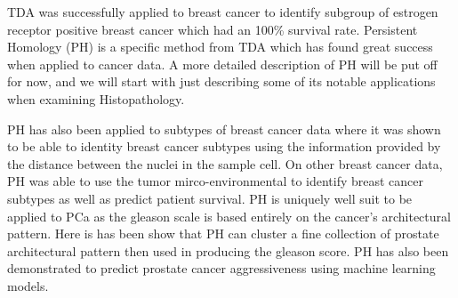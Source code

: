     TDA was successfully applied to breast cancer to identify subgroup of estrogen receptor positive breast cancer which
        had an 100\% survival rate. %
    Persistent Homology (PH) is a specific method from TDA which has found great success when applied to cancer data.
    A more detailed description of PH will be put off for now, and we will start with just describing some of its notable
        applications when examining Histopathology.

    PH has also been applied to subtypes of breast cancer data where it was shown to be able to identity breast cancer
        subtypes using the information provided by the distance between the nuclei in the sample cell.
    On other breast cancer data, PH was able to use the tumor mirco-environmental to identify breast cancer subtypes as
        well as predict patient survival.
    PH is uniquely well suit to be applied to PCa as the gleason scale is based entirely on the cancer's architectural
        pattern.
    Here is has been show that PH can cluster a fine collection of prostate architectural pattern then used in producing
        the gleason score.
    PH has also been demonstrated to predict prostate cancer aggressiveness using machine learning models.



